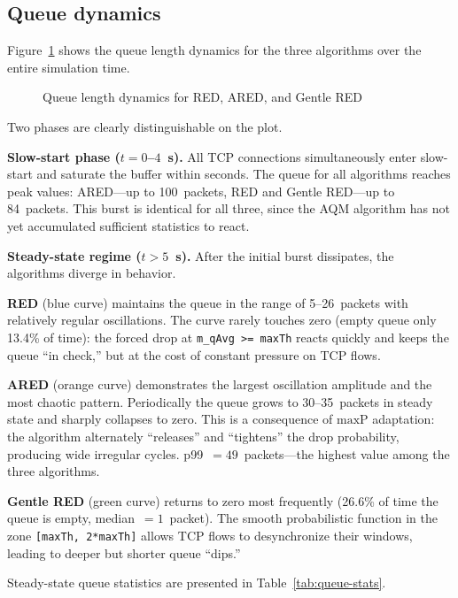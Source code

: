 \documentclass[default]{subfiles}
\begin{document}
{\subsection{Queue dynamics}

Figure~\ref{fig:queue} shows the queue length dynamics for the three algorithms over the entire simulation time.

\begin{figure}[H]
\centering
\resizebox{\textwidth}{!}{}
\caption{Queue length dynamics for RED, ARED, and Gentle RED}
\label{fig:queue}
\end{figure}

Two phases are clearly distinguishable on the plot.

\textbf{Slow-start phase ($t = 0$--$4$~s).} All TCP connections simultaneously enter slow-start and saturate the buffer within seconds. The queue for all algorithms reaches peak values: ARED---up to 100~packets, RED and Gentle RED---up to 84~packets. This burst is identical for all three, since the AQM algorithm has not yet accumulated sufficient statistics to react.

\textbf{Steady-state regime ($t > 5$~s).} After the initial burst dissipates, the algorithms diverge in behavior.

\textbf{RED} (blue curve) maintains the queue in the range of 5--26~packets with relatively regular oscillations. The curve rarely touches zero (empty queue only 13.4\% of time): the forced drop at \texttt{m\_qAvg >= maxTh} reacts quickly and keeps the queue ``in check,'' but at the cost of constant pressure on TCP flows.

\textbf{ARED} (orange curve) demonstrates the largest oscillation amplitude and the most chaotic pattern. Periodically the queue grows to 30--35~packets in steady state and sharply collapses to zero. This is a consequence of $\mathrm{maxP}$ adaptation: the algorithm alternately ``releases'' and ``tightens'' the drop probability, producing wide irregular cycles. p99~$= 49$~packets---the highest value among the three algorithms.

\textbf{Gentle RED} (green curve) returns to zero most frequently (26.6\% of time the queue is empty, median~$= 1$~packet). The smooth probabilistic function in the zone \texttt{[maxTh, 2*maxTh]} allows TCP flows to desynchronize their windows, leading to deeper but shorter queue ``dips.''

Steady-state queue statistics are presented in Table~\ref{tab:queue-stats}.

}
\end{document}
